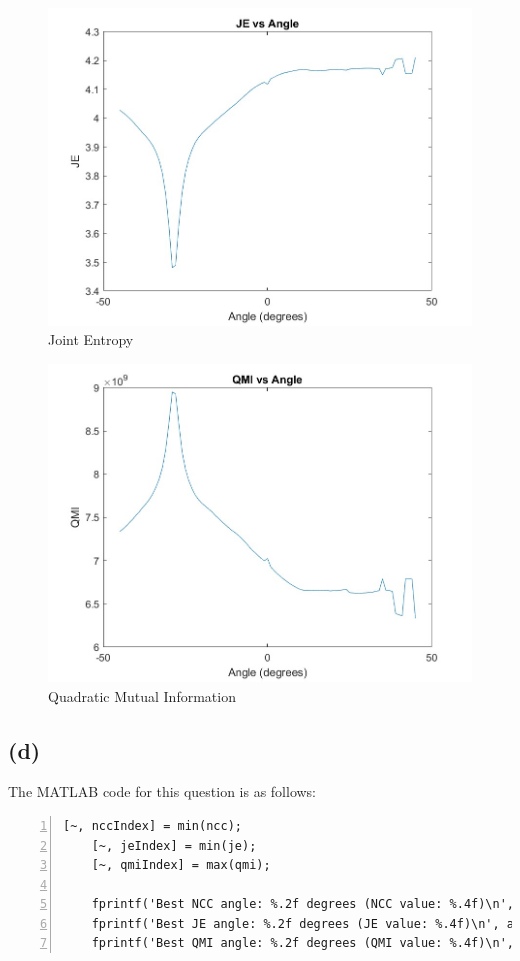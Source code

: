 \documentclass{article}
\begin{document}
\begin{figure}[H]
\centering
\includegraphics[scale=0.3]{JE_vs_Angle.jpg}
\caption{Joint Entropy}
\end{figure}

\begin{figure}[H]
\centering
\includegraphics[scale=0.3]{QMI_vs_Angle.jpg}
\caption{Quadratic Mutual Information}
\end{figure}

\subsection*{(d)}

The MATLAB code for this question is as follows:
\begin{lstlisting}[frame=single,numbers=left,style=Matlab-Pyglike,breaklines=true,postbreak=\mbox{\textcolor{red}{$\hookrightarrow$}\space}]
    [~, nccIndex] = min(ncc);
    [~, jeIndex] = min(je);
    [~, qmiIndex] = max(qmi);
    
    fprintf('Best NCC angle: %.2f degrees (NCC value: %.4f)\n', angles(nccIndex), ncc(nccIndex));
    fprintf('Best JE angle: %.2f degrees (JE value: %.4f)\n', angles(jeIndex), je(jeIndex));
    fprintf('Best QMI angle: %.2f degrees (QMI value: %.4f)\n', angles(qmiIndex), qmi(qmiIndex));    
\end{lstlisting}
\end{document}
